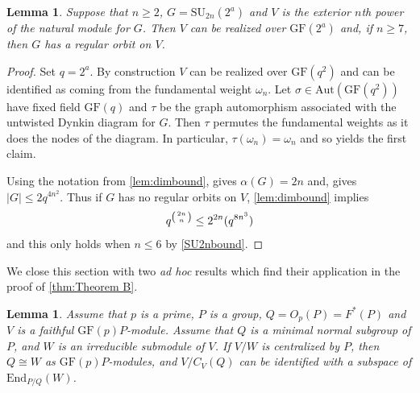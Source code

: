 \documentclass[12pt]{amsart}
\newtheorem{lemma}[theorem]{Lemma}
\theoremstyle{remark}
\theoremstyle{notation}
\theoremstyle{definition}
\newcommand{\SU}{\mathrm{SU}}
\newcommand{\Aut}{\mathrm{Aut}}
\newcommand{\GF}{\mathrm{GF}}
\newcommand{\0}{\emptyset}
\begin{document}
\begin{lemma}\label{lem:unitary dim bound} Suppose that $n \ge 2$, $G= \SU_{2n}(2^a)$ and $V$ is the exterior $n$th power of the natural module for $G$. Then $V $ can be realized over $\GF(2^a)$ and, if $n \ge 7$, then $G$ has a regular orbit on $V$.
\end{lemma}

\begin{proof} Set $q=2^{a}$. By construction $V$ can be realized over $\GF(q^2)$ and can be identified as coming from the fundamental weight $\omega_n$. Let $\sigma \in \Aut(\GF(q^2))$ have fixed field $\GF(q)$ and $\tau$ be the graph automorphism associated with the untwisted Dynkin diagram for $G$. Then $\tau$ permutes the fundamental weights as it does the nodes of the diagram.  In particular, $\tau(\omega_n)= \omega_n$ and so \cite[Proposition 5.4.2]{KleidmanLiebeck} yields the first claim.






Using the notation from \cref{lem:dimbound}, \cite[Theorem 4.2]{GuralnickSaxl} gives $\alpha(G)=2n$ and,    \cite[Corollary 16]{ParkerWilson} gives $|G| \le 2q^{4n^2}$. Thus if $G$ has no  regular orbits on $V$, \cref{lem:dimbound} implies
$$q^{\left({2n}\atop n\right)}  \le 2^{2n} (q^{8n^3})$$ and this only holds when $n \le 6$ by \cref{SU2nbound}.
\end{proof}






We close this section with two \emph{ad hoc} results which find their application in the proof of \cref{thm:Theorem B}.

\begin{lemma}\label{lem:End bound} Assume that $p$ is a prime, $P$ is a group, $Q= O_p(P)=F^*(P)$   and $V$ is a faithful $\GF(p)P$-module. Assume that $Q$ is a minimal normal subgroup of $P$,  and  $W $ is an irreducible submodule of $V$. If $V/W $ is centralized by $P$, then $Q \cong W $ as $\GF(p)P$-modules, and $V/C_V(Q)$ can be identified with a subspace of $ \mathrm{End}_{P/Q}(W)$.
\end{lemma}
\end{document}
